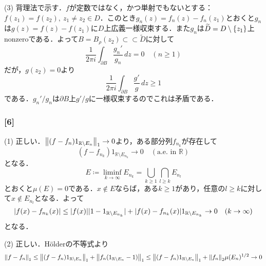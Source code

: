 \documentclass[a4j]{ltjsarticle}
\newcommand{\Rset}{\mathbb{R}}
\newcommand{\1}{\mathbbm{1}}
\numberwithin{equation}{section}
\theoremstyle{definition}
\begin{document}
(3) 背理法で示す．$f$が定数ではなく，かつ単射でもないとする：$f(z_1)=f(z_2),\ z_1\neq z_2\in D$．このとき$g_n(z)=f_n(z)-f_n(z_1)$とおくと$g_n$は$g(z)=f(z)-f(z_1)$に$D$上広義一様収束する．また$g_n$は$\widetilde{D}=D\setminus\qty{z_1}$上nonzeroである．よって$B=B_\rho(z_2)\subset\subset \widetilde{D}$に対して
\begin{equation}
    \frac{1}{2\pi i}\int_{\partial B}\frac{g_n'}{g_n }\,dz =0 \quad (n\geq 1)
\end{equation}
だが，$g(z_2)=0$より
\begin{equation}
    \frac{1}{2\pi i}\int_{\partial B}\frac{g'}{g}\,dz\geq 1 
\end{equation}
である．$g_n'/g_n$は$\partial B$上$g'/g$に一様収束するのでこれは矛盾である．

\subsubsection*{[6]}
(1) 正しい．$\norm{(f-f_n)1_{\Rset\setminus E_n}}_1\to0$より，ある部分列$f_{n_k}$が存在して
\begin{equation}
    (f-f_{n_k})1_{\Rset\setminus E_{n_k}}\to 0\quad (\text{a.e. in $\Rset$})
\end{equation}
となる．
\begin{equation}
    E\coloneq \liminf_{k\to \infty} E_{n_k} =\bigcup_{k\geq1}\bigcap_{l\geq k}E_{n_l}
\end{equation}
とおくと$\mu(E)=0$である．$x\notin E$ならば，ある$k\geq 1$があり，任意の$l\geq k$に対して$x\notin E_{n_l}$となる．よって
\begin{equation}
    \abs{f(x)-f_{n_k}(x)}\leq \abs{f(x)}|1-1_{\Rset\setminus E_{n_k}}|+\abs{f(x)-f_{n_k}(x)}1_{\Rset\setminus E_{n_k}}\to 0\quad (k\to\infty )
\end{equation}
となる．

(2) 正しい．Hölderの不等式より
\begin{equation}
    \norm{f-f_n}_{1}\leq \norm{(f-f_n)1_{\Rset\setminus E_n}}_1+\norm{f_n(1_{\Rset\setminus E_n}-1)}_{1}\leq \norm{(f-f_n)1_{\Rset\setminus E_n}}_1+\norm{f_n}_2 \mu(E_n)^{1/2}\to0 
\end{equation} 
\end{document}
